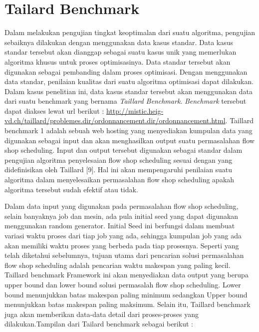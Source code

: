 \section{Tailard Benchmark}
Dalam melakukan pengujian tingkat keoptimalan dari suatu algoritma, pengujian sebaiknya dilakukan dengan menggunakan data kasus standar. Data kasus standar tersebut akan dianggap sebagai suatu kasus unik yang memerlukan algoritma khusus untuk proses optimisasinya. Data standar tersebut akan digunakan sebagai pembanding dalam proses optimisasi. 
Dengan menggunakan data	standar, penilaian kualitas dari suatu algoritma optimisasi dapat dilakukan. Dalam kasus penelitian ini, data kasus standar tersebut akan menggunakan data dari suatu benchmark yang bernama {\it Taillard Benchmark}. {\it Benchmark} tersebut dapat diakses lewat url berikut : \url{http://mistic.heig-vd.ch/taillard/problemes.dir/ordonnancement.dir/ordonnancement.html}.
Taillard benchmark 1 adalah sebuah web hosting yang menyediakan kumpulan data yang digunakan sebagai input dan akan menghasilkan output suatu permasalahan flow shop scheduling. Input dan output tersebut digunakan sebagai standar dalam pengujian algoritma penyelesaian flow shop
scheduling sesuai dengan yang didefinisikan oleh Taillard [9]. Hal ini akan mempengaruhi penilaian suatu algoritma dalam menyelesaikan permasalahan flow shop scheduling apakah algoritma tersebut sudah efektif atau tidak.

Dalam data input yang digunakan pada permasalahan flow shop scheduling, selain banyaknya job dan mesin, ada pula initial seed yang dapat digunakan menggunakan random generator. Initial Seed ini berfungsi dalam membuat variasi waktu proses dari tiap job yang ada, sehingga kumpulan
job yang ada akan memiliki waktu proses yang berbeda pada tiap prosesnya. Seperti yang telah diketahui sebelumnya, tujuan utama dari pencarian solusi permasalahan flow shop scheduling adalah pencarian waktu makespan yang paling kecil. Taillard benchmark Framework
ini akan menyediakan data output yang berupa upper bound dan lower bound solusi permasalah
flow shop scheduling. Lower bound menunjukkan batas makespan paling minimum sedangkan Upper bound menunjukkan batas makespan paling maksimum. Selain itu, Taillard benchmark juga akan memberikan data-data detail dari proses-proses yang dilakukan.Tampilan dari Tailard benchmark sebagai berikut :


